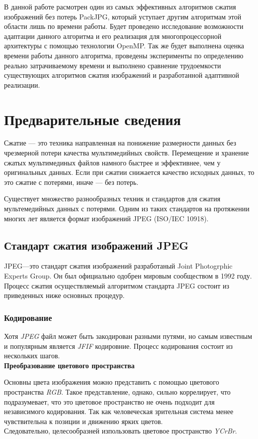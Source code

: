 \documentclass{matmex-diploma-custom}
\begin{document}
 В данной работе расмотрен один из самых эффективных алгоритмов сжатия изображений без потерь PackJPG, который уступает другим алгоритмам этой области лишь по времени работы. Будет проведено исследование возможности адаптации данного алгоритма и его реализация для многопроцессорной архитектуры с помощью технологии OpenMP. Так же будет выполнена оценка времени работы данного алгоритма, проведены эксперименты по  определению реально затрачиваемому времени и выполнено сравнение трудоемкости существующих алгоритмов сжатия изображений и разработанной адаптивной реализации.

\section{Предварительные сведения}
Сжатие --- это техника направленная на понижение размерности данных без чрезмерной потери качества мультимедийных свойств.
Перемещение и хранение сжатых мультимединых  файлов намного быстрее  и эффективнее, чем у оригинальных данных. Если при сжатии снижается качество исходных данных, то это сжатие с потерями, иначе --- без потерь.

Существует множество разнообразных  техник и стандартов для сжатия мультемедийных данных с потерями.
 Одним из таких стандартов на протяжении многих лет является формат изображений JPEG (ISO/IEC 10918).

\subsection{Стандарт сжатия изображений JPEG}
JPEG---это стандарт сжатия изображений разработаный Joint Photogrphic Experts Group. Он был официально одобрен мировым сообществом в 1992 году.%
  Процесс сжатия осуществляемый алгоритмом стандарта JPEG состоит из приведенных ниже основных процедур.

\subsubsection{Кодирование}
Хотя \emph{JPEG} файл может быть закодирован разными путями, но самым известным и популярным является \emph{JFIF} кодировние.
Процесс кодирования состоит из нескольких шагов.\\

\textbf{Преобразование цветового пространства} \newline

Основны цвета изображения можно  представить с помощью цветового пространства \emph{RGB}. Такое представление, однако,
сильно коррелирует, что подразумевает, что это цветовое пространство не очень подходит для независимого кодирования. Так как человеческая зрительная система менее чувствительна к позиции и движению ярких  цветов. \\
Следовательно, целесообразней изпользовать цветовое пространство \emph{YCrBr}.\\
\end{document}
